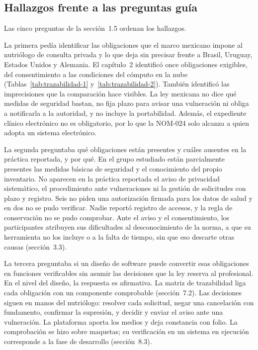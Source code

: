 \documentclass[12pt, a4paper]{article}
\begin{document}
\subsection{Hallazgos frente a las preguntas guía}
Las cinco preguntas de la sección~1.5 ordenan los hallazgos.

La primera pedía identificar las obligaciones que el marco mexicano
impone al nutriólogo de consulta privada y lo que deja sin precisar
frente a Brasil, Uruguay, Estados Unidos y Alemania. El capítulo~2
identificó once obligaciones exigibles, del consentimiento a las
condiciones del cómputo en la nube (Tablas~\ref{tab:trazabilidad-1}
y~\ref{tab:trazabilidad-2}). También identificó las imprecisiones que la
comparación hace visibles. La ley mexicana no dice qué medidas de
seguridad bastan, no fija plazo para avisar una vulneración ni obliga a
notificarla a la autoridad, y no incluye la portabilidad. Además, el
expediente clínico electrónico no es obligatorio, por lo que la NOM-024
solo alcanza a quien adopta un sistema electrónico.

La segunda preguntaba qué obligaciones están presentes y cuáles ausentes
en la práctica reportada, y por qué. En el grupo estudiado están
parcialmente presentes las medidas básicas de seguridad y el
conocimiento del propio inventario. No aparecen en la práctica reportada el aviso de
privacidad sistemático, el procedimiento ante vulneraciones ni
la gestión de solicitudes con plazo y registro. Seis no piden una autorización firmada para los datos de salud y en dos no se pudo verificar. Nadie reportó registro de accesos, y la regla de
conservación no se pudo comprobar. Ante el aviso y el consentimiento, los participantes atribuyen sus dificultades al desconocimiento de la norma, a que su herramienta no los incluye o a la
falta de tiempo, sin que eso descarte otras causas (sección~3.3).

La tercera preguntaba si un diseño de software puede convertir esas
obligaciones en funciones verificables sin asumir las decisiones que la
ley reserva al profesional. En el nivel del diseño, la respuesta es
afirmativa. La matriz de trazabilidad liga cada obligación con un
componente comprobable (sección~7.2). Las decisiones siguen en manos del
nutriólogo: resolver cada solicitud, negar una cancelación con
fundamento, confirmar la supresión, y decidir y enviar el aviso ante una
vulneración. La plataforma aporta los medios y deja constancia con
folio. La comprobación se hizo sobre maquetas; su verificación en un
sistema en ejecución corresponde a la fase de desarrollo (sección~8.3).
\end{document}
